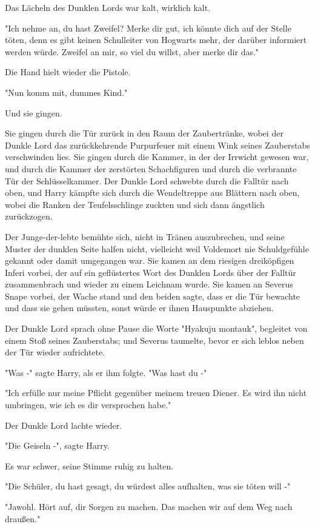 {Das Lächeln des Dunklen Lords war kalt, wirklich kalt.

"Ich nehme an, du hast Zweifel? Merke dir gut, ich könnte dich auf der Stelle töten, denn es gibt keinen Schulleiter von Hogwarts mehr, der darüber informiert werden würde. Zweifel an mir, so viel du willst, aber merke dir das."

Die Hand hielt wieder die Pistole.

"Nun komm mit, dummes Kind."

Und sie gingen.

Sie gingen durch die Tür zurück in den Raum der Zaubertränke, wobei der Dunkle Lord das zurückkehrende Purpurfeuer mit einem Wink seines Zauberstabs verschwinden lies. Sie gingen durch die Kammer, in der der Irrwicht gewesen war, und durch die Kammer der zerstörten Schachfiguren und durch die verbrannte Tür der Schlüsselkammer. Der Dunkle Lord schwebte durch die Falltür nach oben, und Harry kämpfte sich durch die Wendeltreppe aus Blättern nach oben, wobei die Ranken der Teufelsschlinge zuckten und sich dann ängstlich zurückzogen.

Der Junge-der-lebte bemühte sich, nicht in Tränen auszubrechen, und seine Muster der dunklen Seite halfen nicht, vielleicht weil Voldemort nie Schuldgefühle gekannt oder damit umgegangen war. Sie kamen an dem riesigen dreiköpfigen Inferi vorbei, der auf ein geflüstertes Wort des Dunklen Lords über der Falltür zusammenbrach und wieder zu einem Leichnam wurde. Sie kamen an Severus Snape vorbei, der Wache stand und den beiden sagte, dass er die Tür bewachte und dass sie gehen müssten, sonst würde er ihnen Hauspunkte abziehen.

Der Dunkle Lord sprach ohne Pause die Worte "Hyakuju montauk", begleitet von einem Stoß seines Zauberstabs; und Severus taumelte, bevor er sich leblos neben der Tür wieder aufrichtete.

"Was -" sagte Harry, als er ihm folgte. "Was hast du -"

"Ich erfülle nur meine Pflicht gegenüber meinem treuen Diener. Es wird ihn nicht umbringen, wie ich es dir versprochen habe."

Der Dunkle Lord lachte wieder.

"Die Geiseln -", sagte Harry.

Es war schwer, seine Stimme ruhig zu halten.

"Die Schüler, du hast gesagt, du würdest alles aufhalten, was sie töten will -"

"Jawohl. Hört auf, dir Sorgen zu machen. Das machen wir auf dem Weg nach draußen."

}
